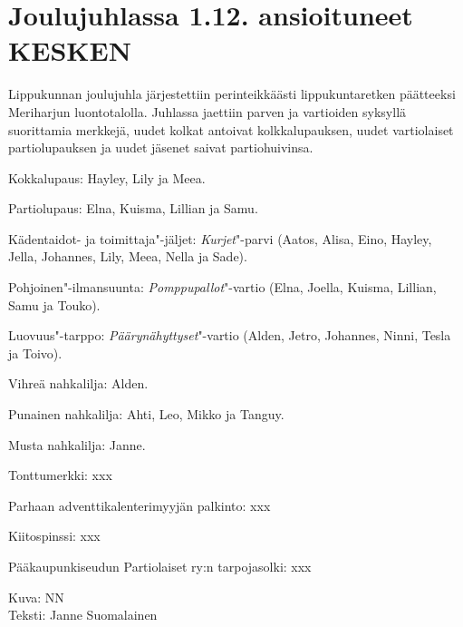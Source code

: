 \section{Joulujuhlassa 1.12. ansioituneet KESKEN}

\begin{multicols}{2}
\noindent Lippukunnan joulujuhla järjestettiin perinteikkäästi 
lippukuntaretken päätteeksi Meriharjun luontotalolla. Juhlassa jaettiin 
parven ja vartioiden syksyllä suorittamia merkkejä, uudet kolkat antoivat 
kolkkalupauksen, uudet vartiolaiset partiolupauksen ja uudet jäsenet saivat 
partiohuivinsa.

Kokkalupaus: Hayley, Lily ja Meea.

Partiolupaus: Elna, Kuisma, Lillian ja Samu.

Kädentaidot- ja toimittaja"-jäljet: \textit{Kurjet}"-parvi (Aatos, Alisa, 
Eino, Hayley, Jella, Johannes, Lily, Meea, Nella ja Sade).

Pohjoinen"-ilmansuunta: \textit{Pomppupallot}"-vartio (Elna, Joella, Kuisma, 
Lillian, Samu ja Touko).

Luovuus"-tarppo: \textit{Päärynähyttyset}"-vartio (Alden, Jetro, Johannes, 
Ninni, Tesla ja Toivo).

Vihreä nahkalilja: Alden.

Punainen nahkalilja: Ahti, Leo, Mikko ja Tanguy.

Musta nahkalilja: Janne.

Tonttumerkki: xxx

Parhaan adventtikalenterimyyjän palkinto: xxx

Kiitospinssi: xxx

Pääkaupunkiseudun Partiolaiset ry:n tarpojasolki: xxx
\end{multicols}

\vspace*{.50cm}
{\raggedleft Kuva: NN\\
Teksti: Janne Suomalainen\par}
